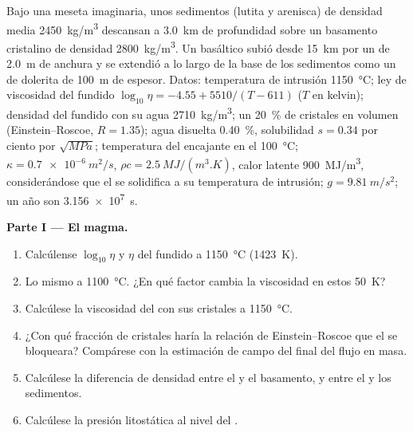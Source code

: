 \begin{problem}
\label{pb:b2:magma-emplacement:1}
Bajo una meseta imaginaria, unos sedimentos (lutita y arenisca) de densidad media
\qty{2450}{kg/m^3} descansan a \qty{3.0}{km} de profundidad sobre un basamento cristalino de
densidad \qty{2800}{kg/m^3}. Un  basáltico subió desde \qty{15}{km} por un 
de \qty{2.0}{m} de anchura y se extendió a lo largo de la base de los sedimentos como un  de dolerita
de \qty{100}{m} de espesor. Datos: temperatura de intrusión \qty{1150}{\celsius}; ley de viscosidad
del fundido $\log_{10}\eta = -4.55 + 5510/(T - 611)$ ($T$ en kelvin); densidad
del fundido con su agua \qty{2710}{kg/m^3}; un \qty{20}{\percent} de cristales en volumen
(Einstein--Roscoe, $R = 1.35$); agua disuelta \qty{0.40}{\percent}, solubilidad
$s = 0.34$ por ciento por $\sqrt{\unit{MPa}}$; temperatura del encajante en el 
\qty{100}{\celsius}; $\kappa = \qty{0.7e-6}{m^2/s}$, $\rho c = \qty{2.5}{MJ/(m^3.K)}$,
calor latente \qty{900}{MJ/m^3}, considerándose que el  se solidifica a su
temperatura de intrusión; $g = \qty{9.81}{m/s^2}$; un año son \qty{3.156e7}{s}.

\medskip\noindent\textbf{Parte I --- El magma.}
\begin{enumerate}
\item Calcúlense $\log_{10}\eta$ y $\eta$ del fundido a \qty{1150}{\celsius}
(\qty{1423}{K}).
\item Lo mismo a \qty{1100}{\celsius}. ¿En qué factor cambia la viscosidad en
estos \qty{50}{K}?
\item Calcúlese la viscosidad del  con sus cristales a
\qty{1150}{\celsius}.
\item ¿Con qué fracción de cristales haría la relación de Einstein--Roscoe que el
 se bloqueara? Compárese con la estimación de campo del final del flujo en masa.
\item Calcúlese la diferencia de densidad entre el  y el basamento, y
entre el  y los sedimentos.
\item Calcúlese la presión litostática al nivel del .
\end{enumerate}


\end{problem}
